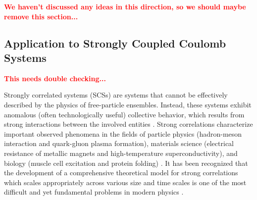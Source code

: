 \documentclass[final,1p,times]{elsarticle}
\newcommand{\no}{\noindent}
\theoremstyle{remark}
\theoremstyle{definition}
\newcommand{\josh}[1]{\textcolor{red}{\textbf{#1}}}
\begin{document}

\no\josh{We haven't discussed any ideas in this direction, so we should maybe remove this section...}

\subsection{Application to Strongly Coupled Coulomb Systems}

\no\josh{This needs double checking...}

Strongly correlated systems (SCSs) are systems that cannot be effectively described by the physics of free-particle ensembles. Instead, these systems exhibit anomalous (often technologically useful) collective behavior, which results from strong interactions between the involved entities \cite{gogolin2004bosonization,avella2012strongly}. Strong correlations characterize important observed phenomena in the fields of particle physics (hadron-meson interaction and quark-gluon plasma formation), materials science (electrical resistance of metallic magnets and high-temperature superconductivity), and biology (muscle cell excitation and protein folding) \cite{anisimov2010electronic,fulde2012electron,
quintanilla2009strong,zhang2008reentrant}. It has been recognized that the development of a comprehensive theoretical model for strong correlations which scales appropriately across various size and time scales is one of the most difficult and yet fundamental problems in modern physics \cite{gogolin2004bosonization,
quintanilla2009strong,kotliar2004strongly}.
\end{document}
